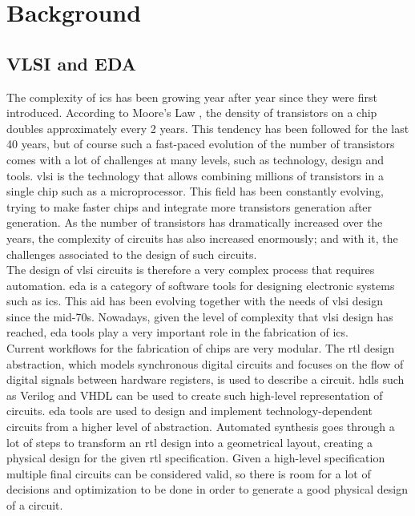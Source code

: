 \chapter{Background}
\label{cha:background}
\section{VLSI and EDA}
\label{sec:VLSIalg}

The complexity of \glspl{ic} has been growing year after year since they were first introduced. According to Moore's Law \cite{moorelaw}, the density of transistors on a chip doubles approximately every 2 years. This tendency has been followed for the last 40 years, but of course such a fast-paced evolution of the number of transistors comes with a lot of challenges at many levels, such as technology, design and tools. \gls{vlsi} is the technology that allows combining millions of transistors in a single chip such as a microprocessor. This field has been constantly evolving, trying to make faster chips and integrate more transistors generation after generation. As the number of transistors has dramatically increased over the years, the complexity of circuits has also increased enormously; and with it, the challenges associated to the design of such circuits. \\

The design of \gls{vlsi} circuits is therefore a very complex process that requires automation. \gls{eda} is a category of software tools for designing electronic systems such as \glspl{ic}. This aid has been evolving together with the needs of \gls{vlsi} design since the mid-70s. Nowadays, given the level of complexity that \gls{vlsi} design has reached, \gls{eda} tools play a very important role in the fabrication of \glspl{ic}. \\

Current workflows for the fabrication of chips are very modular. The \gls{rtl} design abstraction, which models synchronous digital circuits and focuses on the flow of digital signals between hardware registers, is used to describe a circuit.  \glspl{hdl} such as Verilog and VHDL can be used to create such high-level representation of circuits. \gls{eda} tools are used to design and implement technology-dependent circuits from a higher level of abstraction. Automated synthesis goes through a lot of steps to transform an \gls{rtl} design into a geometrical layout, creating a physical design for the given \gls{rtl} specification. Given a high-level specification multiple final circuits can be considered valid, so there is room for a lot of decisions and optimization to be done in order to generate a good physical design of a circuit. \\

